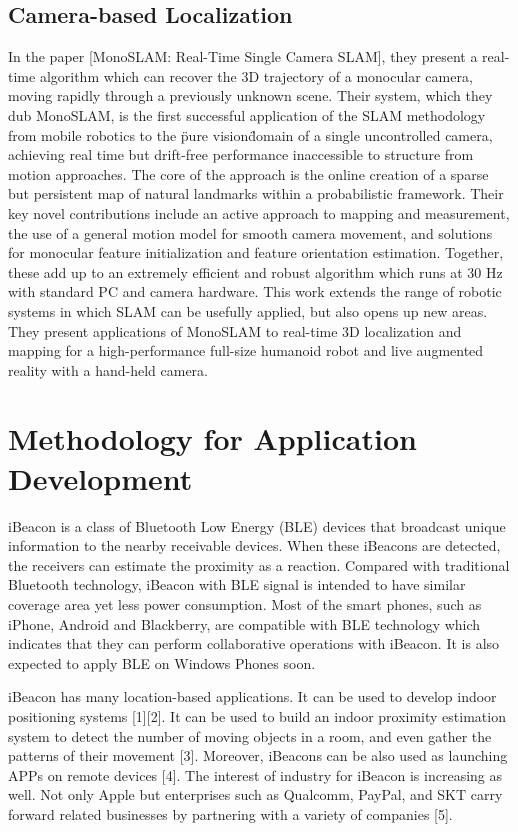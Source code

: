 \documentclass[12pt]{report}
\begin{document}
\section{Camera-based Localization}
In the paper [MonoSLAM: Real-Time Single Camera SLAM], they present a real-time algorithm which can recover the 3D trajectory of a monocular camera, moving rapidly through a previously unknown scene. Their system, which they dub MonoSLAM, is the first successful application of the SLAM methodology from mobile robotics to the \"pure vision\" domain of a single uncontrolled camera, achieving real time but drift-free performance inaccessible to structure from motion approaches. The core of the approach is the online creation of a sparse but persistent map of natural landmarks within a probabilistic framework. Their key novel contributions include an active approach to mapping and measurement, the use of a general motion model for smooth camera movement, and solutions for monocular feature initialization and feature orientation estimation. Together, these add up to an extremely efficient and robust algorithm which runs at 30 Hz with standard PC and camera hardware. This work extends the range of robotic systems in which SLAM can be usefully applied, but also opens up new areas. They present applications of MonoSLAM to real-time 3D localization and mapping for a high-performance full-size humanoid robot and live augmented reality with a hand-held camera.

\fi

\iffalse

\chapter{Methodology for Application Development}
iBeacon is a class of Bluetooth Low Energy (BLE) devices that broadcast unique information to the nearby receivable devices. When these iBeacons are detected, the receivers can estimate the proximity as a reaction. Compared with traditional Bluetooth technology, iBeacon with BLE signal is intended to have similar coverage area yet less power consumption. Most of the smart phones, such as iPhone, Android and Blackberry, are compatible with BLE technology which indicates that they can perform collaborative operations with iBeacon. It is also expected to apply BLE on Windows Phones soon. 

iBeacon has many location-based applications. It can be used to develop indoor positioning systems [1][2]. It can be used to build an indoor proximity estimation system to detect the number of moving objects in a room, and even gather the patterns of their movement [3]. Moreover, iBeacons can be also used as launching APPs on remote devices [4]. The interest of industry for iBeacon is increasing as well. Not only Apple but enterprises such as Qualcomm, PayPal, and SKT carry forward related businesses by partnering with a variety of companies [5]. 
\end{document}
